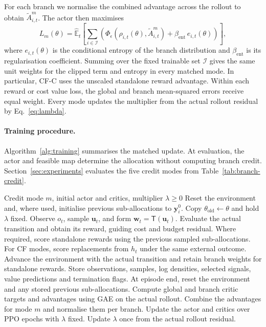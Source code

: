 \documentclass[10pt]{article}
\begin{document}
For each branch we normalise the combined advantage across the rollout to obtain $\widetilde A_{i,t}^{m}$. The actor then maximises
\begin{equation}
  L_m(\theta)=
    \widehat{\mathbb E}_t\!
    \left[\sum_{i\in\mathcal I}
      \left(\Phi_\epsilon(\rho_{i,t}(\theta),\widetilde A_{i,t}^{m})
        +\beta_{\mathrm{ent}}\,e_{i,t}(\theta)\right)\right],
  \label{eq:counterfactual-surrogate}
\end{equation}
where $e_{i,t}(\theta)$ is the conditional entropy of the branch distribution and $\beta_{\mathrm{ent}}$ is its regularisation coefficient. Summing over the fixed trainable set $\mathcal I$ gives the same unit weights for the clipped term and entropy in every matched mode. In particular, CF-C uses the unscaled standalone reward advantage. Within each reward or cost value loss, the global and branch mean-squared errors receive equal weight. Every mode updates the multiplier from the actual rollout residual by Eq.~\eqref{eq:lambda}.

\paragraph{Training procedure.}
Algorithm~\ref{alg:training} summarises the matched update. At evaluation, the actor and feasible map determine the allocation without computing branch credit. Section~\ref{sec:experiments} evaluates the five credit modes from Table~\ref{tab:branch-credit}.

\begin{algorithm}[H]
\caption{Training a feasible allocation policy with branch credit}
\label{alg:training}
\begin{algorithmic}[1]
\Require Credit mode $m$, initial actor and critics, multiplier $\lambda\geq0$
  \State Reset the environment and, where used, initialise previous sub-allocations to $\bm y_i^0$.
  \State Copy $\theta_{\mathrm{old}}\gets\theta$ and hold $\lambda$ fixed.
    \State Observe $o_t$, sample $\bm u_t$, and form $\bm w_t=\mathsf T(\bm u_t)$.
    \State Evaluate the actual transition and obtain its reward, guiding cost and budget residual.
    \State Where required, score standalone rewards using the previous sampled sub-allocations.
    \State For CF modes, score replacements from $h_t$ under the same external outcome.
    \State Advance the environment with the actual transition and retain branch weights for standalone rewards.
    \State Store observations, samples, log densities, selected signals, value predictions and termination flags.
    \State At episode end, reset the environment and any stored previous sub-allocations.
  \EndFor
  \State Compute global and branch critic targets and advantages using GAE on the actual rollout.
  \State Combine the advantages for mode $m$ and normalise them per branch.
  \State Update the actor and critics over PPO epochs with $\lambda$ fixed.
  \State Update $\lambda$ once from the actual rollout residual.
\EndWhile
\end{algorithmic}
\end{algorithm}
\end{document}

